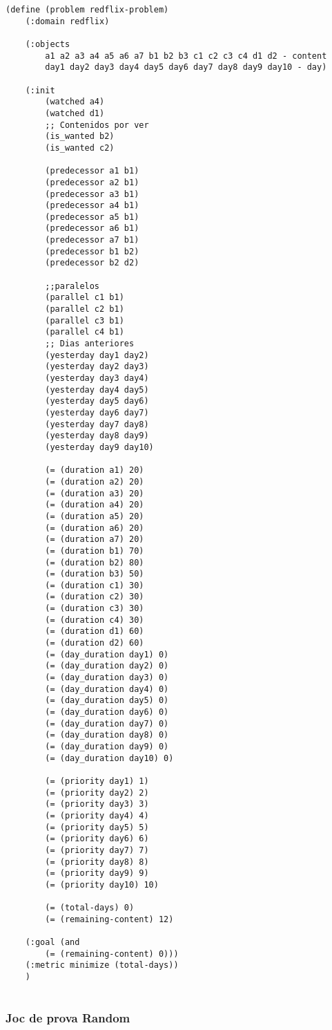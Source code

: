 \documentclass[a4paper]{article}
\begin{document}
	\begin{lstlisting}[language=PDDL, caption={Joc de Prova 2 - Extensió 4}, label={lst:JP24}]                    
	(define (problem redflix-problem)
	(:domain redflix)
	
	(:objects
		a1 a2 a3 a4 a5 a6 a7 b1 b2 b3 c1 c2 c3 c4 d1 d2 - content
		day1 day2 day3 day4 day5 day6 day7 day8 day9 day10 - day)
	
	(:init
		(watched a4)
		(watched d1)
		;; Contenidos por ver
		(is_wanted b2)
		(is_wanted c2)
		
		(predecessor a1 b1)
		(predecessor a2 b1)
		(predecessor a3 b1)
		(predecessor a4 b1)
		(predecessor a5 b1)
		(predecessor a6 b1)
		(predecessor a7 b1)
		(predecessor b1 b2)
		(predecessor b2 d2)
		
		;;paralelos
		(parallel c1 b1)
		(parallel c2 b1)
		(parallel c3 b1)
		(parallel c4 b1)
		;; Dias anteriores
		(yesterday day1 day2)
		(yesterday day2 day3)
		(yesterday day3 day4)
		(yesterday day4 day5)
		(yesterday day5 day6)
		(yesterday day6 day7)
		(yesterday day7 day8)
		(yesterday day8 day9)
		(yesterday day9 day10)
		
		(= (duration a1) 20)
		(= (duration a2) 20)
		(= (duration a3) 20)
		(= (duration a4) 20)
		(= (duration a5) 20)
		(= (duration a6) 20)
		(= (duration a7) 20)
		(= (duration b1) 70)
		(= (duration b2) 80)
		(= (duration b3) 50)
		(= (duration c1) 30)
		(= (duration c2) 30)
		(= (duration c3) 30)
		(= (duration c4) 30)
		(= (duration d1) 60)
		(= (duration d2) 60)
		(= (day_duration day1) 0)
		(= (day_duration day2) 0)
		(= (day_duration day3) 0)
		(= (day_duration day4) 0)
		(= (day_duration day5) 0)
		(= (day_duration day6) 0)
		(= (day_duration day7) 0)
		(= (day_duration day8) 0)
		(= (day_duration day9) 0)
		(= (day_duration day10) 0)
		
		(= (priority day1) 1)
		(= (priority day2) 2)
		(= (priority day3) 3)
		(= (priority day4) 4)
		(= (priority day5) 5)
		(= (priority day6) 6)
		(= (priority day7) 7)
		(= (priority day8) 8)
		(= (priority day9) 9)
		(= (priority day10) 10)
		
		(= (total-days) 0)
		(= (remaining-content) 12) 
	
	(:goal (and
		(= (remaining-content) 0)))
	(:metric minimize (total-days))
	)
		
	\end{lstlisting}
	
	
	\subsubsection*{Joc de prova Random}
	
\end{document}
